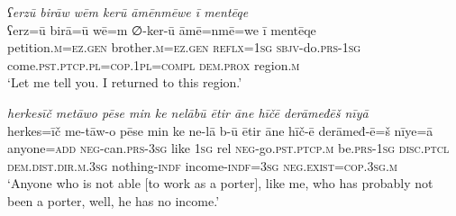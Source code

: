 \ea \label{ŽM.53}
\textit{ʕerzū birāw wēm kerū āmēnmēwe ī mentēqe} \\ 
\gll ʕerz=ū birā=ū wē=m ∅-ker-ū āmē=nmē=we ī mentēqe \\ 
 petition\textsc{.m}\textsc{=ez.gen} brother\textsc{.m}\textsc{=ez.gen} \textsc{reflx}\textsc{=\textsc{1sg}} \textsc{sbjv-}do\textsc{.prs}\textsc{-\textsc{1sg}} come\textsc{.pst}\textsc{.ptcp}\textsc{.pl}\textsc{=cop}\textsc{.\textsc{1pl}}\textsc{=compl} \textsc{dem.prox} region\textsc{.m} \\ 
\glt `Let me tell you. I returned to this region.'
\z 
 
\ea \label{ŽM.62}
\textit{herkesīč metāwo pēse min ke nelābū ētir āne hīčē derāmeđēš nīyā} \\ 
\gll herkes=īč me-tāw-o pēse min ke ne-lā b-ū ētir āne hīč-ē derāmeđ-ē=š nīye=ā \\ 
 anyone\textsc{=add} \textsc{neg-}can\textsc{.prs}\textsc{-3sg} like \textsc{1sg} rel \textsc{neg-}go\textsc{.pst}\textsc{.ptcp}\textsc{.m} be\textsc{.prs}\textsc{-\textsc{1sg}} \textsc{disc.ptcl} \textsc{dem.dist}\textsc{.dir}\textsc{.m}\textsc{.3sg} nothing\textsc{-indf} income\textsc{-indf}\textsc{=3sg} \textsc{\textsc{neg.}exist}\textsc{=cop}\textsc{.3sg}\textsc{.m} \\ 
\glt `Anyone who is not able [to work as a porter], like me, who has probably not been a porter, well, he has no income.'
\z 
 
